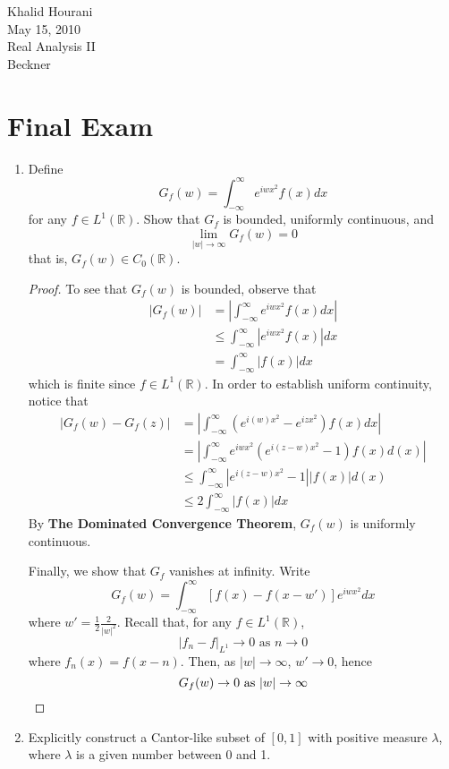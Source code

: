 \documentclass[12pt,leqno]{article}
\numberwithin{equation}{section}
\theoremstyle{definition}
\begin{document}
\thispagestyle{plain}
\begin{flushright}Khalid Hourani\\
May 15, 2010\\
Real Analysis II\\
Beckner
\end{flushright}
{\center\section*{{\huge Final Exam}}}

\begin{enumerate}
 \item Define \[G_f(w)=\int_{-\infty}^{\infty}e^{iwx^2}f(x)dx\] for any $f\in L^1(\mathbb{R})$. Show that $G_f$ is bounded, uniformly continuous, and \[\displaystyle\lim_{|w|\to\infty}G_f(w)=0\] that is, $G_f(w)\in C_0(\mathbb{R})$.

\begin{proof}
 To see that $G_f(w)$ is bounded, observe that \begin{align*}|G_f(w)|&=\left|\int_{-\infty}^{\infty}e^{iwx^2}f(x)dx\right|\\&\leq\int_{-\infty}^{\infty}\left|e^{iwx^2}f(x)\right|dx\\&=\int_{-\infty}^{\infty}|f(x)|dx\end{align*} which is finite since $f\in L^1(\mathbb{R})$. In order to establish uniform continuity, notice that \begin{align*}\left|G_f(w)-G_f(z)\right|&=\left|\int_{-\infty}^{\infty}\left(e^{i(w)x^2}-e^{izx^2}\right)f(x)dx\right|\\&=\left|\int_{-\infty}^{\infty}e^{iwx^2}\left(e^{i(z-w)x^2}-1\right)f(x)d(x)\right|\\&\leq\int_{-\infty}^{\infty}\left|e^{i(z-w)x^2}-1\right||f(x)|d(x)\\&\leq2\int_{-\infty}^{\infty}|f(x)|dx\end{align*} By \textbf{The Dominated Convergence Theorem}, $G_f(w)$ is uniformly continuous. 

Finally, we show that $G_f$ vanishes at infinity. Write \[G_f(w)=\int_{-\infty}^{\infty}\left[f(x)-f(x-w')\right]e^{iwx^2}dx\] where $w'=\frac{1}{2}\frac{2}{|w|^2}$. Recall that, for any $f\in L^1(\mathbb{R})$, \[|f_n-f|_{L^1}\to0\text{ as }n\to0\] where $f_n(x)=f(x-n)$. Then, as $|w|\to\infty$, $w'\to0$, hence \[G_f(w)\to0\text{ as }|w|\to\infty\qedhere\]
\end{proof}

\item Explicitly construct a Cantor-like subset of $[0,1]$ with positive measure $\lambda$, where $\lambda$ is a given number between 0 and 1.


\end{enumerate}
\end{document}
